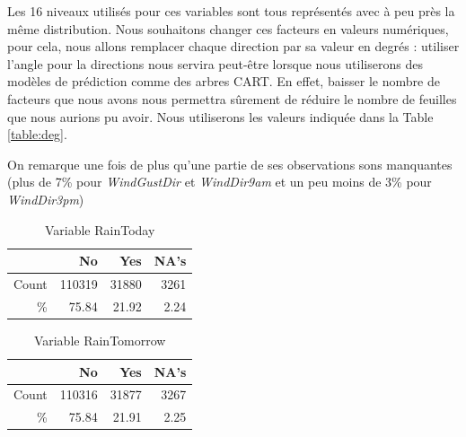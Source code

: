\documentclass{article}
\begin{document}
Les 16 niveaux utilisés pour ces variables sont tous représentés avec à peu près la même distribution. Nous souhaitons changer ces facteurs en valeurs numériques, pour cela, nous allons remplacer chaque direction par sa valeur en degrés : utiliser l'angle pour la directions nous servira peut-être lorsque nous utiliserons des modèles de prédiction comme des arbres CART. En effet, baisser le nombre de facteurs que nous avons nous permettra sûrement de réduire le nombre de feuilles que nous aurions pu avoir. Nous utiliserons les valeurs indiquée dans la Table \ref{table:deg}.

\begin{table}[H]
    \centering
    \caption{Les 16 points cardinaux en degrés}
    \label{table:deg}
\end{table}

On remarque une fois de plus qu'une partie de ses observations sons manquantes (plus de 7\% pour \emph{WindGustDir} et \emph{WindDir9am} et un peu moins de 3\% pour \emph{WindDir3pm})


\begin{table}[p]
    \centering
    \begin{tabular}{|r||rrr|}
        \hline
        &    No &    Yes &   NA's \\
        \hline
        \hline
        Count & 110319 &  31880 &   3261 \\
        \% & 75.84 & 21.92 & 2.24 \\
        \hline
    \end{tabular}
    \caption{Variable RainToday}
    \label{table:rain_today}
\end{table}

\begin{table}[p]
    \centering
    \begin{tabular}{|r||rrr|}
        \hline
        &    No &    Yes &   NA's \\
        \hline
        \hline
        Count & 110316 &  31877 &   3267 \\
        \% & 75.84 & 21.91 & 2.25 \\
        \hline
    \end{tabular}
    \caption{Variable RainTomorrow}
    \label{table:rain_tomorrow}
\end{table}
\end{document}
